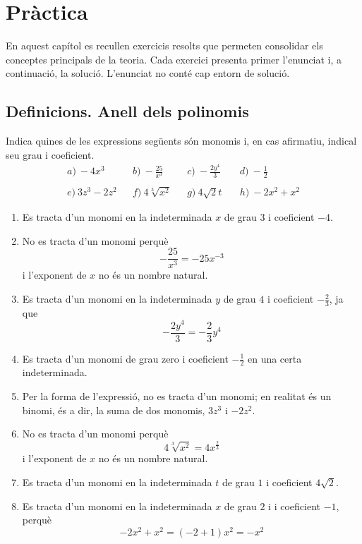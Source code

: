 \chapter{Pràctica}
\label{cap:practica}

En aquest capítol es recullen exercicis resolts que permeten consolidar els conceptes principals de la teoria. Cada exercici presenta primer l'enunciat i, a continuació, la solució. L'enunciat no conté cap entorn de solució.

\section{Definicions. Anell dels polinomis}

\begin{exercici}
Indica quines de les expressions següents són monomis i, en cas
afirmatiu, indical seu grau i coeficient.\[
\begin{array}{lllllll}
a)~-4x^{3} & & b)~-\frac{25}{x^{3}} & & c)~-\frac{2y^{4}}{3} & & d)~-\frac{1}{2} \\
& & & & & & \\
e)~3z^{3}-2z^{2} & & f)~4\sqrt[3]{x^{2}} & & g)~4\sqrt{2}t~ & &
h)~-2x^{2}+x^{2}\end{array}\]
\end{exercici}

\begin{solucio}
\begin{enumerate}
\item[a)] Es tracta d'un monomi en la indeterminada $x$ de grau $3$ i
coeficient $-4$.

\item[b)] No es tracta d'un monomi perquè\[
-\frac{25}{x^{3}}=-25x^{-3}
\]i l'exponent de $x$ no és un nombre natural.

\item[c)] Es tracta d'un monomi en la indeterminada $y$ de grau $4$ i
coeficient $-\frac{2}{3}$, ja que\[
-\frac{2y^{4}}{3}=-\frac{2}{3}y^{4}
\]

\item[d)] Es tracta d'un monomi de grau zero i coeficient $-\frac{1}{2}$
en una certa indeterminada.

\item[e)] Per la forma de l'expressió, no es tracta d'un monomi; en
realitat és un binomi, és a dir, la suma de dos monomis, $3z^{3}$ i $-2z^{2}.$

\item[f)] No es tracta d'un monomi perquè\[
4\sqrt[3]{x^{2}}=4x^{\frac{2}{3}}
\]i l'exponent de $x$ no és un nombre natural.

\item[g)] Es tracta d'un monomi en la indeterminada $t$ de grau $1$ i
coeficient $4\sqrt{2}$.

\item[h)] Es tracta d'un monomi en la indeterminada $x$ de grau $2$ i i
coeficient $-1$, perquè\[
-2x^{2}+x^{2}=(-2+1)x^{2}=-x^{2}
\]
\end{enumerate}
\end{solucio}

